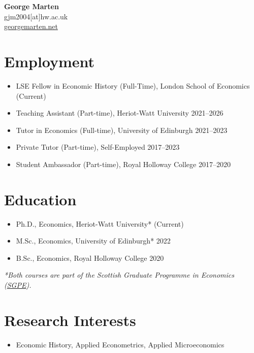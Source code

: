 \documentclass[11pt,a4paper]{article}
\begin{document}
\begin{center}
    {\huge \textbf{George Marten}} \\[0.5em]
    {gjm2004[at]hw.ac.uk} \\
    \href{https://georgemarten.net}{georgemarten.net}
\end{center}

\section{Employment}
\begin{itemize}
    \item [] LSE Fellow in Economic History (Full-Time), London School of Economics \hfill (Current) 
    \item [] Teaching Assistant (Part-time), Heriot-Watt University \hfill 2021--2026
    \item [] Tutor in Economics (Full-time), University of Edinburgh \hfill 2021--2023
    \item [] Private Tutor (Part-time), Self-Employed \hfill  2017--2023
    \item [] Student Ambassador (Part-time), Royal Holloway College \hfill 2017--2020
\end{itemize}

\section{Education}
\begin{itemize}
    \item [] Ph.D., Economics, Heriot-Watt University* \hfill (Current) 
    \item [] M.Sc., Economics, University of Edinburgh* \hfill 2022 
    \item [] B.Sc., Economics, Royal Holloway College \hfill 2020
\end{itemize}
\textit{*Both courses are part of the Scottish Graduate Programme in Economics (\href{https://economics.ed.ac.uk/study-with-us/postgraduate/scottish-graduate-programme-economics}{SGPE}).}

\section{Research Interests}
\begin{itemize}
    \item [] Economic History, Applied Econometrics, Applied Microeconomics
\end{itemize} 
\end{document}
